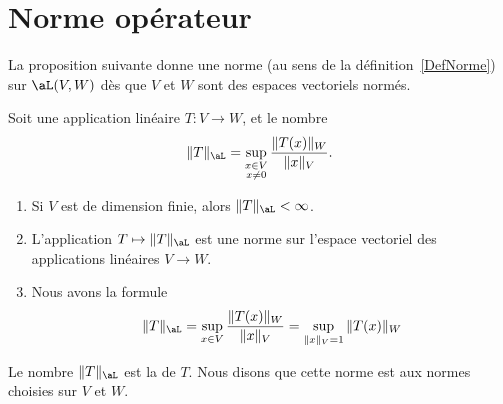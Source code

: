 \section{Norme opérateur}

La proposition suivante donne une norme (au sens de la définition~\ref{DefNorme}) sur $\aL(V,W)$ dès que \( V\) et \( W\) sont des espaces vectoriels normés.
\begin{propositionDef}          \label{DefNFYUooBZCPTr}
    Soit une application linéaire \( T\colon V\to W\), et le nombre
	\begin{equation}
        \|T\|_{\aL}=\sup_{\substack{x\in V\\x\neq 0}}\frac{\|T(x)\|_{W}}{\|x\|_{V}}.
	\end{equation}
    \begin{enumerate}
        \item
            Si \( V\) est de dimension finie, alors \( \| T \|_{\aL}<\infty\).
        \item
            L'application \( T\mapsto\| T \|_{\aL}\) est une norme sur l'espace vectoriel des applications linéaires \( V\to W\).
        \item       \label{ITEMooUQPRooYQGZzu}
            Nous avons la formule
            \begin{equation}    \label{EqFZPooIoecGH}
                \| T \|_{\aL}=\sup_{x\in V}\frac{\|T(x)\|_{W}}{\|x\|_{V}} =\sup_{\|x\|_{V}=1}\|T(x)\|_{W}
            \end{equation}
    \end{enumerate}
    Le nombre \( \| T \|_{\aL}\) est la  de $T$. Nous disons que cette norme est  aux normes choisies sur \( V\) et \( W\).
\end{propositionDef}

